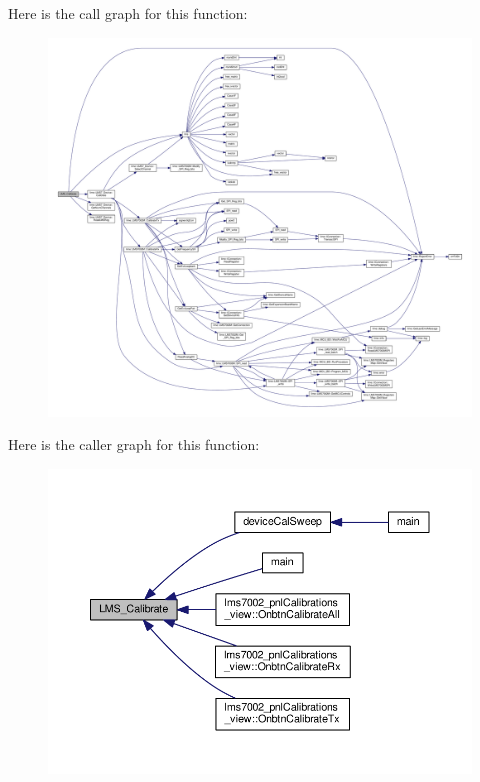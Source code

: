 Here is the call graph for this function\+:
\nopagebreak
\begin{figure}[H]
\begin{center}
\leavevmode
\includegraphics[width=350pt]{df/de1/lms7__api_8cpp_a30253e6e7221c70d726b6bb06c69e43e_cgraph}
\end{center}
\end{figure}




Here is the caller graph for this function\+:
\nopagebreak
\begin{figure}[H]
\begin{center}
\leavevmode
\includegraphics[width=350pt]{df/de1/lms7__api_8cpp_a30253e6e7221c70d726b6bb06c69e43e_icgraph}
\end{center}
\end{figure}


